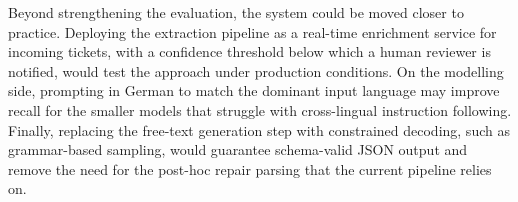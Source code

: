 Beyond strengthening the evaluation, the system could be moved closer to
practice.  Deploying the extraction pipeline as a real-time enrichment service
for incoming tickets, with a confidence threshold below which a human reviewer
is notified, would test the approach under production conditions.  On the
modelling side, prompting in German to match the dominant input language may
improve recall for the smaller models that struggle with cross-lingual
instruction following.  Finally, replacing the free-text generation step with
constrained decoding, such as grammar-based sampling, would guarantee
schema-valid JSON output and remove the need for the post-hoc repair parsing
that the current pipeline relies on.

